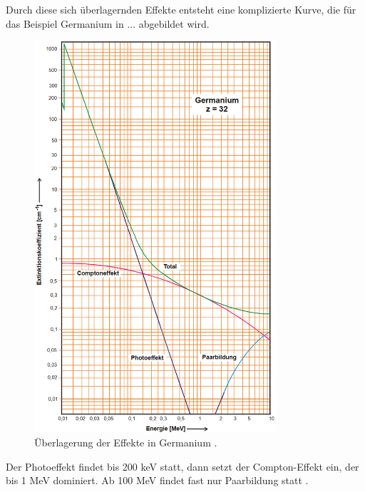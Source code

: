 Durch diese sich überlagernden Effekte entsteht eine komplizierte Kurve, die für das Beispiel Germanium in ... abgebildet wird. 
\begin{figure}[H]
    \centering
    \includegraphics[width = 9cm]{1}
    \caption{Überlagerung der Effekte in Germanium \cite{sample}.}
    \label{1}
  \end{figure}
Der Photoeffekt findet bis 200 keV statt, dann setzt der Compton-Effekt ein, der bis 1 MeV dominiert. Ab 100 MeV findet fast nur Paarbildung statt \cite{sample}. 

